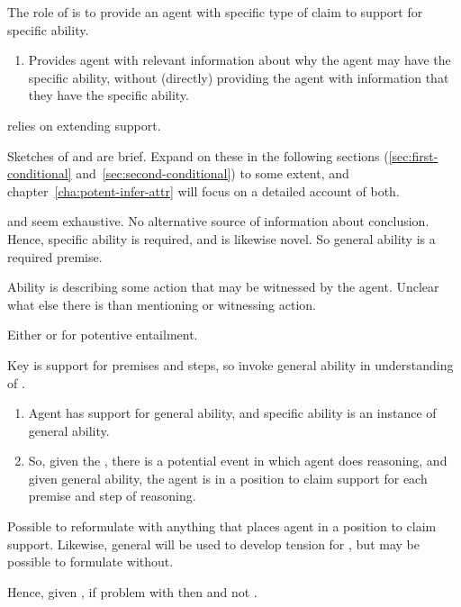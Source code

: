 \begin{note}
   The role of \gsi{} is to provide an agent with specific type of claim to support for specific ability.
  \begin{enumerate}
  \item Provides agent with relevant information about why the agent may have the specific ability, without (directly) providing the agent with information that they have the specific ability.
  \end{enumerate}

  \WR{} relies on extending support.
\end{note}

\begin{note}
  Sketches of \AR{} and \WR{} are brief.
  Expand on these in the following sections (\ref{sec:first-conditional} and~\ref{sec:second-conditional}) to some extent, and chapter~\ref{cha:potent-infer-attr} will focus on a detailed account of both.
\end{note}

\begin{note}
  \AR{} and \WR{} seem exhaustive.
  No alternative source of information about conclusion.
  Hence, specific ability is required, and is likewise novel.
  So general ability is a required premise.

  Ability is describing some action that may be witnessed by the agent.
  Unclear what else there is than mentioning or witnessing action.

  \begin{proposition}\label{either-AR-or-WR}
    Either \WR{} or \AR{} for potentive entailment.
  \end{proposition}
\end{note}

\begin{note}[\WR{} alternative]
  Key is support for premises and steps, so invoke general ability in understanding of \WR{}.

  \begin{enumerate}
  \item Agent has support for general ability, and specific ability is an instance of general ability.
  \item So, given the \GSI{}, there is a potential event in which agent does reasoning, and given general ability, the agent is in a position to claim support for each premise and step of reasoning.
  \end{enumerate}

  Possible to reformulate with anything that places agent in a position to claim support.
  Likewise, general will be used to develop tension for \AR{}, but may be possible to formulate without.

  Hence, given \label{either-AR-or-WR}, if problem with \AR{} then \WR{} and not \uRa{}.
\end{note}

